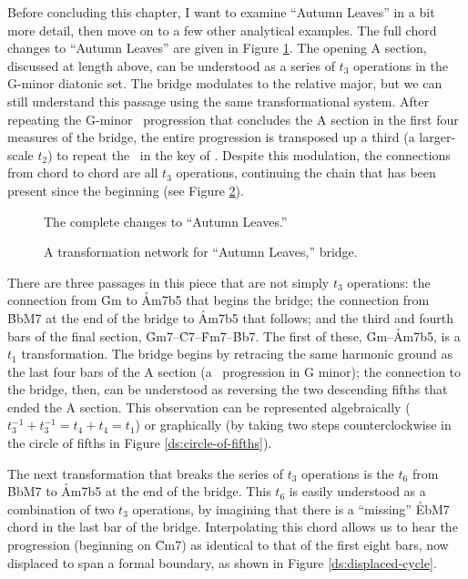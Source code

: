 Before concluding this chapter, I want to examine “Autumn Leaves” in a bit
more detail, then move on to a few other analytical examples. The full chord
changes to “Autumn Leaves” are given in Figure
\ref{ds:autumn-leaves-complete}. The opening A section, discussed at length
above, can be understood as a series of $t_3$ operations in the G-minor
diatonic set. The bridge modulates to the relative major, but we can still
understand this passage using the same transformational system. After
repeating the G-minor \tfo\ progression that concludes the A section in the
first four measures of the bridge, the entire progression is transposed up a
third (a larger-scale $t_2$) to repeat the \tfo\ in the key of \Bflat. Despite
this modulation, the connections from chord to chord are all $t_3$ operations,
continuing the chain that has been present since the beginning (see Figure
\ref{ds:autumn-leaves-bridge}).

\begin{figure}[h!tbp]
  \caption{The complete changes to “Autumn Leaves.”}
  \label{ds:autumn-leaves-complete}
\end{figure}

\begin{figure}[htbp]
  \vspace{\baselineskip}
  \caption{A transformation network for “Autumn Leaves,” bridge.}
  \label{ds:autumn-leaves-bridge}
\end{figure}

There are three passages in this piece that are not simply $t_3$ operations:
the connection from \h{Gm} to \h{Am7b5} that begins the bridge; the connection
from \h{BbM7} at the end of the bridge to \h{Am7b5} that follows; and the
third and fourth bars of the final section,
\h{Gm7}--\h{C7}--\h{Fm7}--\h{Bb7}. The first of these, \h{Gm}--\h{Am7b5}, is a
$t_1$ transformation. The bridge begins by retracing the same harmonic ground
as the last four bars of the A section (a \tfo\ progression in G minor); the
connection to the bridge, then, can be understood as reversing the two
descending fifths that ended the A section. This observation can be
represented algebraically ($t_3^{-1} + t_3^{-1} = t_4 + t_4 = t_1$) or
graphically (by taking two steps counterclockwise in the circle of fifths in
Figure \ref{ds:circle-of-fifths}).

The next transformation that breaks the series of $t_3$ operations is the
$t_6$ from \h{BbM7} to \h{Am7b5} at the end of the bridge. This $t_6$ is
easily understood as a combination of two $t_3$ operations, by imagining that
there is a “missing” \h{EbM7} chord in the last bar of the bridge.
Interpolating this chord allows us to hear the progression (beginning on
\h{Cm7}) as identical to that of the first eight bars, now displaced to span a
formal boundary, as shown in Figure \ref{ds:displaced-cycle}.


